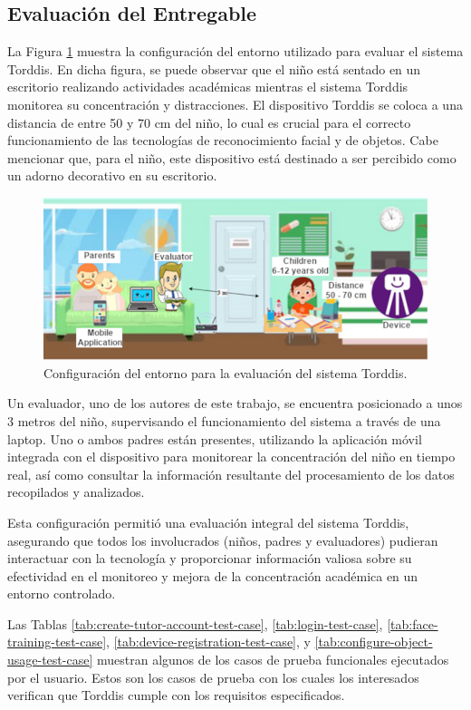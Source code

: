 \documentclass[a4paper,fleqn]{cas-sc}
\begin{document}
	\subsection{Evaluación del Entregable}
	La Figura \ref{fig:ConfigEvaluation} muestra la configuración del entorno utilizado para evaluar el sistema Torddis. En dicha figura, se puede observar que el niño está sentado en un escritorio realizando actividades académicas mientras el sistema Torddis monitorea su concentración y distracciones. El dispositivo Torddis se coloca a una distancia de entre 50 y 70 cm del niño, lo cual es crucial para el correcto funcionamiento de las tecnologías de reconocimiento facial y de objetos. Cabe mencionar que, para el niño, este dispositivo está destinado a ser percibido como un adorno decorativo en su escritorio.
	
	\begin{figure}[hbt!]
		\centering
		\includegraphics[width=\linewidth]{figs/Figure_10}
		\caption{Configuración del entorno para la evaluación del sistema Torddis. \label{fig:ConfigEvaluation}} 
	\end{figure}
	
	Un evaluador, uno de los autores de este trabajo, se encuentra posicionado a unos 3 metros del niño, supervisando el funcionamiento del sistema a través de una laptop. Uno o ambos padres están presentes, utilizando la aplicación móvil integrada con el dispositivo para monitorear la concentración del niño en tiempo real, así como consultar la información resultante del procesamiento de los datos recopilados y analizados.
	
	Esta configuración permitió una evaluación integral del sistema Torddis, asegurando que todos los involucrados (niños, padres y evaluadores) pudieran interactuar con la tecnología y proporcionar información valiosa sobre su efectividad en el monitoreo y mejora de la concentración académica en un entorno controlado.
	
	Las Tablas \ref{tab:create-tutor-account-test-case}, \ref{tab:login-test-case}, \ref{tab:face-training-test-case}, \ref{tab:device-registration-test-case}, y \ref{tab:configure-object-usage-test-case} muestran algunos de los casos de prueba funcionales ejecutados por el usuario. Estos son los casos de prueba con los cuales los interesados verifican que Torddis cumple con los requisitos especificados.
	
\end{document}
